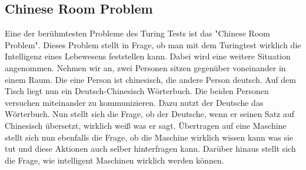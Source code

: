 \subsection{Chinese Room Problem}
Eine der berühmtesten Probleme des Turing Tests ist das "Chinese Room Problem". Dieses Problem stellt in Frage, ob man mit dem Turingtest wirklich die Intelligenz eines Lebewesens feststellen kann. Dabei wird eine weitere Situation angenommen. Nehmen wir an, zwei Personen sitzen gegenüber voneinander in einem Raum. Die eine Person ist chinesisch, die andere Person deutsch. Auf dem Tisch liegt nun ein Deutsch-Chinesisch Wörterbuch. Die beiden Personen versuchen miteinander zu kommunizieren. Dazu nutzt der Deutsche das Wörterbuch. Nun stellt sich die Frage, ob der Deutsche, wenn er seinen Satz auf Chinesisch übersetzt, wirklich weiß was er sagt. Übertragen auf eine Maschine stellt sich nun ebenfalls die Frage, ob die Maschine wirklich wissen kann was sie tut und diese Aktionen auch selber hinterfragen kann. Darüber hinaus stellt sich die Frage, wie intelligent Maschinen wirklich werden können.

